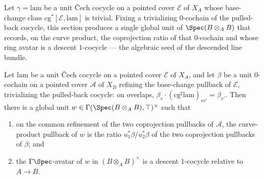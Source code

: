 Let \(\gamma = \mathrm{lam}\) be a unit \v Cech cocycle on a pointed cover \(\mathcal E\) of
\(X_A\) whose base-change class \(\mathrm{cg}^{*}[\mathcal E, \mathrm{lam}]\) is trivial. Fixing
a trivializing \(0\)-cochain of the pulled-back cocycle, this section produces a single global
unit of \(\Spec(B \otimes_A B)\) that records, on the curve product, the coprojection ratio of
that \(0\)-cochain and whose ring avatar is a descent \(1\)-cocycle — the algebraic seed of the
descended line bundle.

\begin{theorem}
  \label{thm:exists_kernelDescentUnit}
  \leanok
  Let \(\mathrm{lam}\) be a unit \v Cech cocycle on a pointed cover \(\mathcal E\) of \(X_A\),
  and let \(\beta\) be a unit \(0\)-cochain on a pointed cover \(\mathcal A\) of \(X_B\) refining
  the base-change pullback of \(\mathcal E\), trivializing the pulled-back cocycle: on overlaps,
  \(\beta_v \cdot (\mathrm{cg}^{\sharp}\mathrm{lam})_{vv'} = \beta_{v'}\). Then there is a global
  unit \(w \in \Gamma(\Spec(B \otimes_A B), \top)^{\times}\) such that
  \begin{enumerate}
    \item on the common refinement of the two coprojection pullbacks of \(\mathcal A\), the
      curve-product pullback of \(w\) is the ratio \(u_1^{*}\beta / u_2^{*}\beta\) of the two
      coprojection pullbacks of \(\beta\); and
    \item the \(\Gamma\Spec\)-avatar of \(w\) in \((B \otimes_A B)^{\times}\) is a descent
      \(1\)-cocycle relative to \(A \to B\).
  \end{enumerate}
\end{theorem}
